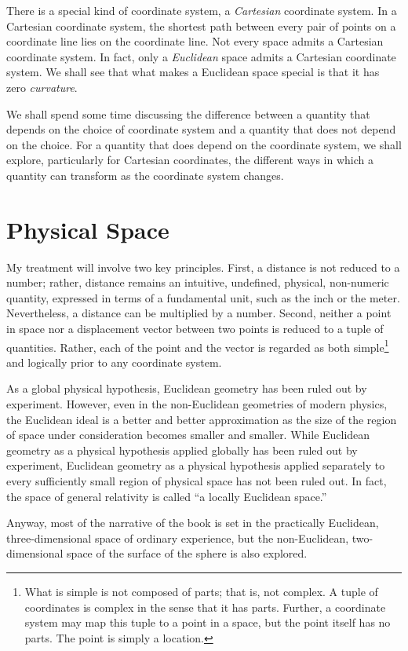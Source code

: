 There is a special kind of coordinate system, a \emph{Cartesian} coordinate
system.  In a Cartesian coordinate system, the shortest path between every pair
of points on a coordinate line lies on the coordinate line.  Not every space
admits a Cartesian coordinate system.  In fact, only a \emph{Euclidean} space
admits a Cartesian coordinate system.  We shall see that what makes a Euclidean
space special is that it has zero \emph{curvature}.

We shall spend some time discussing the difference between a quantity that
depends on the choice of coordinate system and a quantity that does not depend
on the choice.  For a quantity that does depend on the coordinate system, we
shall explore, particularly for Cartesian coordinates, the different ways in
which a quantity can transform as the coordinate system changes.

\section{Physical Space}

My treatment will involve two key principles.  First, a distance is not reduced
to a number; rather, distance remains an intuitive, undefined, physical,
non-numeric quantity, expressed in terms of a fundamental unit, such as the
inch or the meter.  Nevertheless, a distance can be multiplied by a number.
Second, neither a point in space nor a displacement vector between two points
is reduced to a tuple of quantities.  Rather, each of the point and the vector
is regarded as both simple\footnote{%
   What is simple is not composed of parts; that is, not complex.  A tuple of
   coordinates is complex in the sense that it has parts.  Further, a
   coordinate system may map this tuple to a point in a space, but the point
   itself has no parts.  The point is simply a location.%
}
and logically prior to any coordinate system.

As a global physical hypothesis, Euclidean geometry has been ruled out by
experiment.
However, even in the non-Euclidean geometries of modern physics, the Euclidean
ideal is a better and better approximation as the size of the region of space
under consideration becomes smaller and smaller.  While Euclidean geometry as a
physical hypothesis applied globally has been ruled out by experiment,
Euclidean geometry as a physical hypothesis applied separately to every
sufficiently small region of physical space has not been ruled out.  In fact,
the space of general relativity is called ``a locally Euclidean space.''

Anyway, most of the narrative of the book is set in the practically Euclidean,
three-dimensional space of ordinary experience, but the non-Euclidean,
two-dimensional space of the surface of the sphere is also explored.


